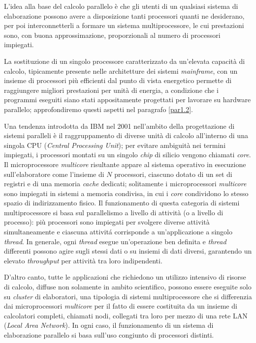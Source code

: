 \nocite{Patterson2022}
L'idea alla base del calcolo parallelo \`e che gli utenti di un qualsiasi sistema di elaborazione possono avere a disposizione tanti processori
quanti ne desiderano, per poi interconnetterli a formare un sistema
multiprocessore, le cui prestazioni sono, con buona approssimazione,
proporzionali al numero di processori impiegati.

La sostituzione di un singolo processore caratterizzato da un'elevata
capacit\`a di calcolo, tipicamente presente nelle architetture dei sistemi
\textit{mainframe}, con un insieme di processori pi\`u efficienti
dal punto di vista energetico permette di raggiungere migliori prestazioni
per unit\`a di energia, a condizione che i programmi eseguiti siano stati
appositamente progettati per lavorare su hardware parallelo; approfondiremo questi aspetti nel paragrafo \ref{par1.2}.

Una tendenza introdotta da IBM nel 2001 nell'ambito della progettazione di sistemi paralleli \cite{Tendler2001} è il raggruppamento
di diverse unit\`a di calcolo all'interno di una singola CPU (\textit{Central Processing Unit}); per evitare ambiguit\`a nei termini impiegati, i processori montati su un singolo \textit{chip} di silicio vengono chiamati \textit{core}.\newline
Il microprocessore \textit{multicore} risultante appare al sistema operativo in esecuzione sull'elaboratore come l'insieme di $N$ processori, ciascuno dotato di un set di registri e di una memoria \textit{cache} dedicati; solitamente i microprocessori \textit{multicore} sono impiegati in sistemi a memoria condivisa, in cui i \textit{core} condividono lo stesso spazio di indirizzamento fisico.\newline
Il funzionamento di questa categoria di sistemi multiprocessore si basa sul parallelismo a livello di attivit\`a (o a livello di processo): pi\`u
processori sono impiegati per svolgere diverse attivit\`a simultaneamente e ciascuna attivit\'a corrisponde a un'applicazione a singolo
\textit{thread}.\newline
In generale, ogni \textit{thread} esegue un'operazione ben definita e \textit{thread} differenti possono agire sugli stessi
dati o su insiemi di dati diversi, garantendo un elevato \textit{throughput} per attivit\`a tra loro indipendenti.

D'altro canto, tutte le applicazioni che richiedono un utilizzo intensivo di risorse di calcolo, diffuse non solamente in ambito
scientifico, possono essere eseguite solo su \textit{cluster} di elaboratori, una tipologia di sistemi multiprocessore che si differenzia dai microprocessori \textit{multicore} per il fatto di essere costituita da un insieme di calcolatori completi, chiamati nodi, collegati tra loro per mezzo di una rete LAN (\textit{Local Area Network}).\newline
In ogni caso, il funzionamento di un sistema di elaborazione parallelo si basa sull'uso congiunto di processori distinti.

